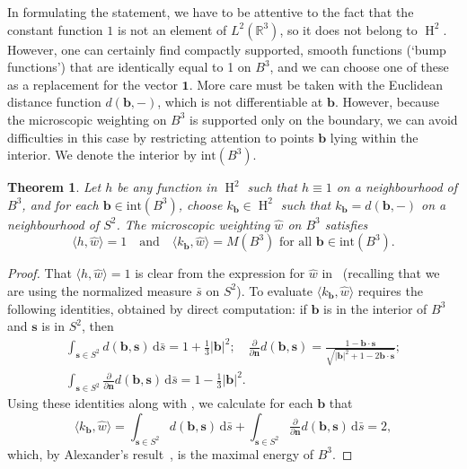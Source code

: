\documentclass[a4paper, oneside, reqno]{amsart}
\newtheorem{theorem}{Theorem}[section]
\theoremstyle{definition}
\theoremstyle{remark}
\numberwithin{equation}{section}
\renewcommand{\d}{d}
\renewcommand{\vec}{\mathbf}
\newcommand{\onevector}{\mathbf{1}}
\newcommand{\R}{\mathbb{R}}
\newcommand{\dd}{\mathrm{d}} %
\newcommand{\dispair}[2]{\langle #2,#1 \rangle}
\DeclareMathOperator{\besselspace}{H}
\begin{document}
In formulating the statement, we have to be attentive to the fact that the constant function \(1\) is not an element of \(L^2(\R^3)\), so it does not belong to \(\besselspace^2\). However, one can certainly find compactly supported, smooth functions (`bump functions') that are identically equal to 1 on \(B^3\), and we can choose one of these as a replacement for the vector \(\onevector\). More care must be taken with the Euclidean distance function \(d(\vec{b},-)\), which is not differentiable at \(\vec{b}\). However, because the microscopic weighting on \(B^3\) is supported only on the boundary, we can avoid difficulties in this case by restricting attention to points \(\vec{b}\) lying within the interior. We denote the interior by \(\mathrm{int}(B^3)\).

\begin{theorem}
\label{thm:compact_gauging_maximal_energy}
    Let \(h\) be any function in \(\besselspace^{2}\) such that \(h \equiv 1\) on a neighbourhood of \(B^3\), and for each \(\vec{b} \in \mathrm{int}(B^3)\), choose \(k_{\vec{b}} \in \besselspace^{2}\) such that \(k_{\vec{b}} = d(\vec{b},-)\) on a neighbourhood of \(S^2\). The microscopic weighting \(\widehat{w}\) on \(B^3\) satisfies
    \[\dispair{\widehat{w}}{h} = 1 \quad \text{and} \quad \dispair{\widehat{w}}{k_{\vec{b}}} = M(B^3) \text{ for all } \vec{b} \in \mathrm{int}(B^3).\]
\end{theorem}

\begin{proof}
That \(\dispair{\widehat{w}}{h} = 1\) is clear from the expression for \(\widehat{w}\) in~ (recalling that we are using the normalized measure \(\bar s\) on \(S^2\)). To evaluate \(\dispair{\widehat{w}}{k_{\vec{b}}}\) requires the following identities, obtained by direct computation: if \(\vec{b}\) is in the interior of \(B^3\) and \(\vec{s}\) is in \(S^2\), then     
\begin{gather*}
    \int_{\vec{s} \in S^2} \d(\vec{b}, \vec{s}) \,\dd \bar{s} 
    = 
    1 + \tfrac{1}{3}\left|\vec{b}\right|^2;
    \quad
    \tfrac{\partial}{\partial \vec{n}}\d(\vec{b}, \vec{s}) 
    = 
    \tfrac{1 - \vec{b}\cdot \vec{s}}{\sqrt{\left|\vec{b}\right|^2 + 1 - 2\vec{b}\cdot \vec{s}}};
    \\
    \int_{\vec{s} \in S^2} \tfrac{\partial}{\partial \vec{n}}\d(\vec{b}, \vec{s}) \,\dd \bar{s} 
    = 
    1 - \tfrac{1}{3}\left|\vec{b}\right|^2.
\end{gather*}
Using these identities along with , we calculate for each \(\vec{b}\) that
\[
        \dispair{\widehat{w}}{k_{\vec{b}}} 
        =  
        \int_{\vec{s} \in S^2} \d(\vec{b},\vec{s}) \,\dd \bar{s} 
        +
        \int_{\vec{s} \in S^2} \tfrac{\partial}{\partial \vec{n}}\d(\vec{b},\vec{s}) \,\dd \bar{s} 
        =
        2,
    \]
which, by Alexander's result~\cite{Alexander:two-problems}, is the maximal energy of \(B^3\).
\end{proof}
\end{document}
